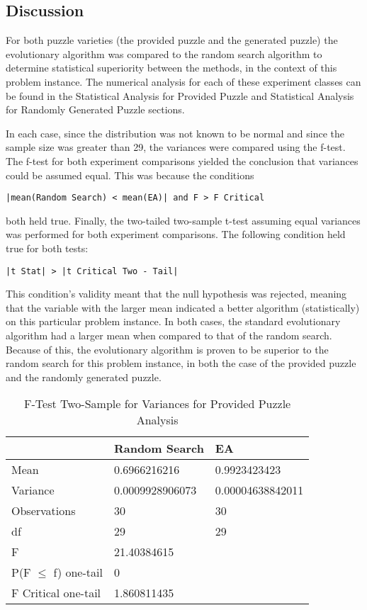 \documentclass[11pt]{article}
\begin{document}
\subsection{Discussion}

For both puzzle varieties (the provided puzzle and the generated puzzle) the 
evolutionary algorithm was compared to the random search algorithm to determine 
statistical superiority between the methods, in the context of this problem instance. 
The numerical analysis for each of these experiment classes can be found in the 
Statistical Analysis for Provided Puzzle and Statistical Analysis for Randomly 
Generated Puzzle sections.

In each case, since the distribution was not known to be normal and since the 
sample size was greater than 29, the variances were compared using the f-test. 
The f-test for both experiment comparisons yielded the conclusion that variances 
could be assumed equal. This was because the conditions 

\begin{center}
\texttt{|mean(Random Search) < mean(EA)| and F > F Critical}
\end{center}

both held true. Finally, the two-tailed two-sample t-test assuming equal variances was 
performed for both experiment comparisons. The following condition held true for both 
tests:

\begin{center}
\texttt{|t Stat| > |t Critical Two - Tail|}
\end{center}

This condition's validity meant that the null hypothesis was rejected, meaning that the 
variable with the larger mean indicated a better algorithm (statistically) on this 
particular problem instance. In both cases, the standard evolutionary algorithm had a 
larger mean when compared to that of the random search. Because of this, the 
evolutionary algorithm is proven to be superior to the random search for this problem 
instance, in both the case of the provided puzzle and the randomly generated puzzle.


\begin{table}[H]
\centering
\caption{F-Test Two-Sample for Variances for Provided Puzzle Analysis}
\label{my-label}
\begin{tabular}{l|l|l}
 & Random Search & EA \\ \hline
Mean & 0.6966216216 & 0.9923423423 \\
Variance & 0.0009928906073 & 0.00004638842011 \\
Observations & 30 & 30 \\
df & 29 & 29 \\
F & 21.40384615 &  \\
P(F $\leq$ f) one-tail & 0 &  \\
F Critical one-tail & 1.860811435 & 
\end{tabular}
\end{table}
\end{document}
